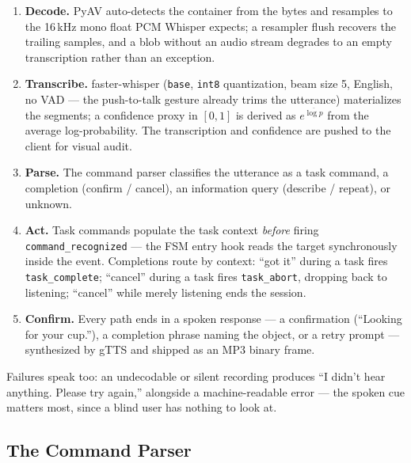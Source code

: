 \begin{enumerate}[nosep]
  \item \textbf{Decode.} PyAV auto-detects the container from the bytes and
        resamples to the 16\,kHz mono float PCM Whisper expects; a resampler
        flush recovers the trailing samples, and a blob without an audio stream
        degrades to an empty transcription rather than an exception.
  \item \textbf{Transcribe.} faster-whisper (\texttt{base}, \texttt{int8}
        quantization, beam size 5, English, no VAD --- the push-to-talk gesture
        already trims the utterance) materializes the segments; a confidence proxy
        in $[0,1]$ is derived as $e^{\overline{\log p}}$ from the average
        log-probability. The transcription and confidence are pushed to the client
        for visual audit.
  \item \textbf{Parse.} The command parser classifies the utterance as a task
        command, a completion (confirm / cancel), an information query (describe /
        repeat), or unknown.
  \item \textbf{Act.} Task commands populate the task context \emph{before}
        firing \texttt{command\_recognized} --- the FSM entry hook reads the
        target synchronously inside the event. Completions route by context:
        ``got it'' during a task fires \texttt{task\_complete}; ``cancel'' during
        a task fires \texttt{task\_abort}, dropping back to listening; ``cancel''
        while merely listening ends the session.
  \item \textbf{Confirm.} Every path ends in a spoken response --- a confirmation
        (``Looking for your cup.''), a completion phrase naming the object, or a
        retry prompt --- synthesized by gTTS and shipped as an MP3 binary frame.
\end{enumerate}

Failures speak too: an undecodable or silent recording produces ``I didn't hear
anything. Please try again,'' alongside a machine-readable error --- the spoken cue
matters most, since a blind user has nothing to look at.

\subsection{The Command Parser}
\label{sec:command_parsing_impl}

